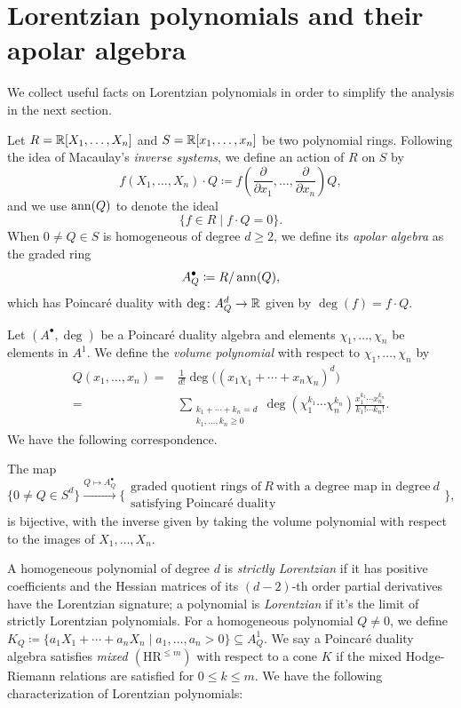 \section{Lorentzian polynomials and their apolar algebra}

We collect useful facts on Lorentzian polynomials in order to simplify the analysis in the next section.

Let $R=\mathbb{R}[X_1,\ldots,X_n]$ and $S=\mathbb{R}[x_1,\ldots,x_n]$ be two polynomial rings. Following the idea of Macaulay's \textit{inverse systems}, we define an action of $R$ on $S$ by
\[
    f(X_1,\ldots,X_n)\cdot Q\coloneqq  f(\frac{\partial}{\partial x_1},\ldots,\frac{\partial}{\partial x_n})Q,
\]
and we use $\operatorname{ann}(Q)$ to denote the ideal
\[
    \{f\in R\mid f\cdot Q=0\}. 
\]
When $0\neq Q\in S$ is homogeneous of degree $d\geq 2$, we define its \textit{apolar algebra} as the graded ring
\[
    A^\bullet_Q\coloneqq R/\operatorname{ann}(Q),
\]
which has Poincar\'e duality with $\deg\colon A^d_Q\to \mathbb{R}$ given by $\deg(f)=f\cdot Q$.

Let $(A^\bullet,\deg)$ be a Poincar\'e duality algebra and elements $\chi_1,\ldots,\chi_n$ be elements in $A^1$. We define the \textit{volume polynomial} with respect to $\chi_1,\ldots,\chi_n$ by
\begin{align*}
    Q(x_1,\ldots,x_n)=&\frac{1}{d!}\deg\big((x_1\chi_1+\cdots+x_n\chi_n)^d\big)\\
    =&\sum_{\substack{
    k_1+\cdots +k_n=d\\k_1,\ldots ,k_n\geq 0    }}\deg(\chi_1^{k_1}\cdots\chi_n^{k_n})\frac{x_1^{k_1}\cdots x_n^{k_n}}{k_1!\cdots k_n!}.
\end{align*}
We have the following correspondence.
\begin{theorem} The map
\[
    \big\{0\neq Q\in S^d\big\}\xrightarrow{Q\mapsto A^\bullet_Q}\big\{\substack{\text{graded quotient rings of}\ R\ \text{with a degree map in degree}\ d\\ \text{satisfying Poincar\'e duality}}\big\},
\]
is bijective, with the inverse given by taking the volume polynomial with respect to the images of $X_1,\ldots,X_n$.
\end{theorem}

A homogeneous polynomial of degree $d$ is \textit{strictly Lorentzian} if it has positive coefficients and the Hessian matrices of its $(d-2)$-th order partial derivatives have the Lorentzian signature; a polynomial is \textit{Lorentzian} if it's the limit of strictly Lorentzian polynomials. For a homogeneous polynomial $Q\neq 0$, we define $K_Q\coloneqq \{a_1X_1+\cdots+a_nX_n\mid a_1,\ldots,a_n>0\}\subseteq A^1_Q$. We say a Poincar\'e duality algebra satisfies \textit{mixed $(\mathrm{HR}^{\leq m})$} with respect to a cone $K$ if the mixed Hodge-Riemann relations are satisfied for $0\leq k\leq m$. We have the following characterization of Lorentzian polynomials:

